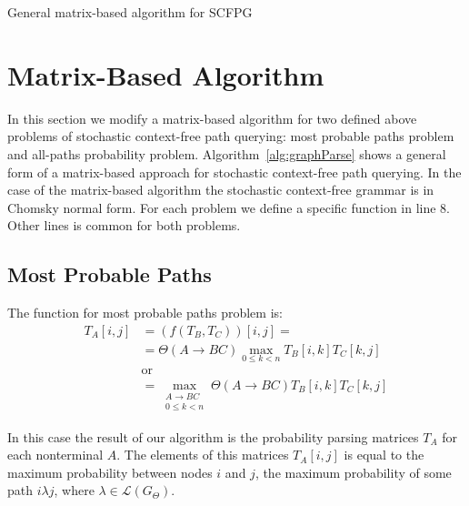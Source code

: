 \documentclass[sigconf, 10pt]{acmart}
\begin{document}
\begin{algorithm}[t]
\begin{algorithmic}[1]
\caption{General matrix-based algorithm for SCFPG}
\label{alg:graphParse}
    
        \EndFor
    \EndFor    
    \EndWhile
\EndFunction
\end{algorithmic}
\end{algorithm}

\section{Matrix-Based Algorithm}

In this section we modify a matrix-based algorithm for two defined above problems of stochastic context-free path querying: most probable paths problem and all-paths probability problem.
Algorithm~\ref{alg:graphParse} shows a general form of a matrix-based approach for stochastic context-free path querying. 
In the case of the matrix-based algorithm the stochastic context-free grammar is in Chomsky normal form.
For each problem we define a specific function in line 8. Other lines is common for both problems.

\subsection{Most Probable Paths}

The function for most probable paths problem is:
\begin{align}
\label{mpp}
    T_A[i,j] &= (f(T_B, T_C))[i,j] = \\
             &=\Theta(A \to BC)  \max_{0 \leq k < n} T_B[i,k] T_C[k,j] \nonumber \\
             & \text{or} \nonumber \\
             &= \max_{\substack{A \to BC \\ 0 \leq k < n}} \Theta(A \to BC) T_B[i,k] T_C[k,j] \nonumber 
\end{align}

In this case the result of our algorithm is the probability parsing matrices $T_A$ for each nonterminal $A$. The elements of this matrices $T_A[i,j]$ is equal to the maximum probability between nodes $i$ and $j$, the maximum probability of some path $i \lambda j$, where $\lambda \in \mathcal{L}(G_\Theta)$.
\end{document}
